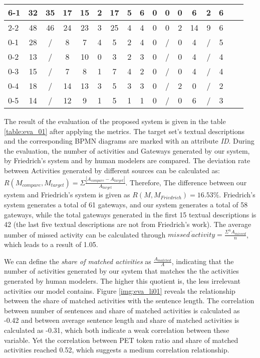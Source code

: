 \begin{table}[]
\begin{tabular}{|l|c|c|c|c|c|c|c|c|c|c|c|c|c|c|c|c|}
6-1 & 32 & 35 & 17 & 15 & 2 & 17 & 5 & 6 & 0 & 0 & 0 & 6  & 2 & 6 \\ \hline
2-2 & 48 & 46 & 24 & 23 & 3 & 25 & 4 & 4 & 0 & 0 & 2 & 14 & 9 & 6 \\ \hline
0-1 & 28 & /  & 8  & 7  & 4 & 5  & 2 & 4 & 0 & / & 0 & 4  & / & 5 \\ \hline
0-2 & 13 & /  & 8  & 10 & 0 & 3  & 2 & 3 & 0 & / & 0 & 4  & / & 4 \\ \hline
0-3 & 15 & /  & 7  & 8  & 1 & 7  & 4 & 2 & 0 & / & 0 & 4  & / & 4 \\ \hline
0-4 & 18 & /  & 14 & 13 & 3 & 5  & 3 & 3 & 0 & / & 2 & 0  & / & 2 \\ \hline
0-5 & 14 & /  & 12 & 9  & 1 & 5  & 1 & 1 & 0 & / & 0 & 6  & / & 3 \\ \hline
\end{tabular}
\end{table}

The result of the evaluation of the proposed system is given in the table \ref{table:eva_01} after applying the metrics. The target set's textual descriptions and the corresponding BPMN diagrams are marked with an attribute \textit{ID}. During the evaluation, the number of activities and Gateways generated by our system, by Friedrich's system and by human modelers are compared. The deviation rate between Activities generated by different sources can be calculated as: $R(M_{compare}, M_{target}) = \Sigma\frac{|A_{compare} - A_{target}|}{A_{target}}$. Therefore, The difference between our system and Friedrich's system is given as $R(M, M_{Friedrich}) = 16.53\%$. Friedrich's system generates a total of 61 gateways, and our system generates a total of 58 gateways, while the total gateways generated in the first 15 textual descriptions is 42 (the last five textual descriptions are not from Friedrich's work). The average number of missed activity can be calculated through $\overline{missed\ activity} = \frac{\Sigma^n A_{missed}}{n}$, which leads to a result of 1.05.

We can define the \textit{share of matched activities} as $\frac{A_{matched}}{A}$, indicating that the number of activities generated by our system that matches the the activities generated by human modelers. The higher this quotient is, the less irrelevant activities our model contains. Figure \ref{img:eva_li01} reveals the relationship between the share of matched activities with the sentence length. The correlation between number of sentences and share of matched activities is calculated as -0.42 and between average sentence length and share of matched activities is calculated as -0.31, which both indicate a weak correlation between these variable. Yet the correlation between PET token ratio and share of matched activities reached 0.52, which suggests a medium correlation relationship. 

